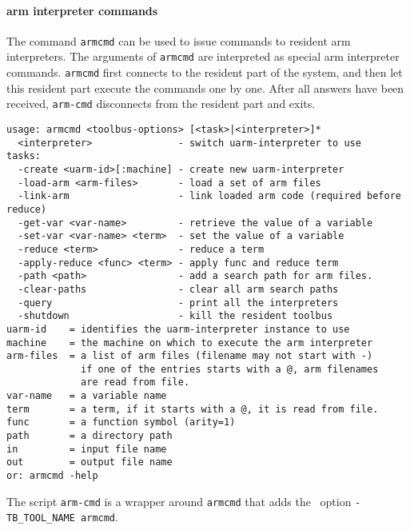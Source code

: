\paragraph{arm interpreter commands}
The command {\tt armcmd} can be used to issue commands to resident
arm interpreters. The arguments of {\tt armcmd} are interpreted
as special arm interpreter commands. {\tt armcmd} first connects to
the resident part of the system, and then let this resident part
execute the commands one by one. After all answers have been received,
{\tt arm-cmd} disconnects from the resident part and exits.
\begin{verbatim}
usage: armcmd <toolbus-options> [<task>|<interpreter>]*
  <interpreter>               - switch uarm-interpreter to use
tasks:
  -create <uarm-id>[:machine] - create new uarm-interpreter
  -load-arm <arm-files>       - load a set of arm files
  -link-arm                   - link loaded arm code (required before reduce)
  -get-var <var-name>         - retrieve the value of a variable
  -set-var <var-name> <term>  - set the value of a variable
  -reduce <term>              - reduce a term
  -apply-reduce <func> <term> - apply func and reduce term
  -path <path>                - add a search path for arm files.
  -clear-paths                - clear all arm search paths
  -query                      - print all the interpreters
  -shutdown                   - kill the resident toolbus
uarm-id    = identifies the uarm-interpreter instance to use
machine    = the machine on which to execute the arm interpreter
arm-files  = a list of arm files (filename may not start with -)
             if one of the entries starts with a @, arm filenames
             are read from file.
var-name   = a variable name
term       = a term, if it starts with a @, it is read from file.
func       = a function symbol (arity=1)
path       = a directory path
in         = input file name
out        = output file name
or: armcmd -help
\end{verbatim}
The script {\tt arm-cmd} is a wrapper around {\tt armcmd} that adds
the \TB\ option {\tt -TB\_TOOL\_NAME armcmd}.




